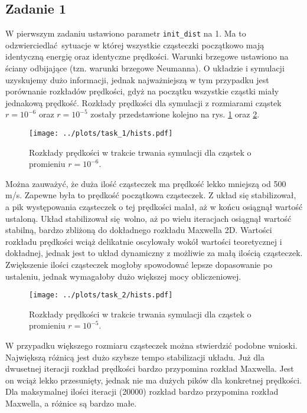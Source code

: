 \documentclass[a4paper, 12pt]{article}
\begin{document}
	\subsection*{Zadanie 1}
	
	W pierwszym zadaniu ustawiono parametr \texttt{init\_dist} na 1. 
	Ma to odzwierciedlać sytuacje w której wszystkie cząsteczki początkowo mają identyczną energię oraz identyczne prędkości.
	Warunki brzegowe ustawiono na ściany odbijające (tzn. warunki brzegowe Neumanna).
	O układzie i symulacji uzyskujemy dużo informacji, jednak najważniejszą w tym przypadku jest porównanie rozkładów prędkości, gdyż na początku wszystkie cząstki miały jednakową prędkość.
	Rozkłady prędkości dla symulacji z rozmiarami cząstek $r = 10^{-6}$ oraz $r = 10^{-5}$ zostały przedstawione kolejno na rys. \ref{hist_task_1} oraz \ref{hist_task_2}.
	\begin{figure}[H]
		\centering
		\texttt{[image: ../plots/task\_1/hists.pdf]}
		\caption{Rozkłady prędkości w trakcie trwania symulacji dla cząstek o promieniu $r = 10^{-6}$.}
		\label{hist_task_1}
	\end{figure}
	
	\noindent Można zauważyć, że duża ilość cząsteczek ma prędkość lekko mniejszą od 500 m/s. 
	Zapewne była to prędkość początkowa cząsteczek.
	Z układ się stabilizował, a pik występowania cząsteczek o tej prędkości malał, aż w końcu osiągnął wartość ustaloną.
	Układ stabilizował się wolno, aż po wielu iteracjach osiągnął wartość stabilną, bardzo zbliżoną do dokładnego rozkładu Maxwella 2D.
	Wartości rozkładu prędkości wciąż delikatnie oscylowały wokół wartości teoretycznej i dokładnej, jednak jest to układ dynamiczny z możliwie za małą ilością cząsteczek.
	Zwiększenie ilości cząsteczek mogłoby spowodować lepsze dopasowanie po ustaleniu, jednak wymagałoby dużo większej mocy obliczeniowej.
	
	\begin{figure}[H]
		\centering
		\texttt{[image: ../plots/task\_2/hists.pdf]}
		\caption{Rozkłady prędkości w trakcie trwania symulacji dla cząstek o promieniu $r = 10^{-5}$.}
		\label{hist_task_2}
	\end{figure} 
	
	\noindent W przypadku większego rozmiaru cząsteczek można stwierdzić podobne wnioski.
	Największą różnicą jest dużo szybsze tempo stabilizacji układu.
	Już dla dwusetnej iteracji rozkład prędkości bardzo przypomina rozkład Maxwella.
	Jest on wciąż lekko przesunięty, jednak nie ma dużych pików dla konkretnej prędkości. 
	Dla maksymalnej ilości iteracji (20000) rozkład bardzo przypomina rozkład Maxwella, a różnice są bardzo małe.
	
\end{document}
